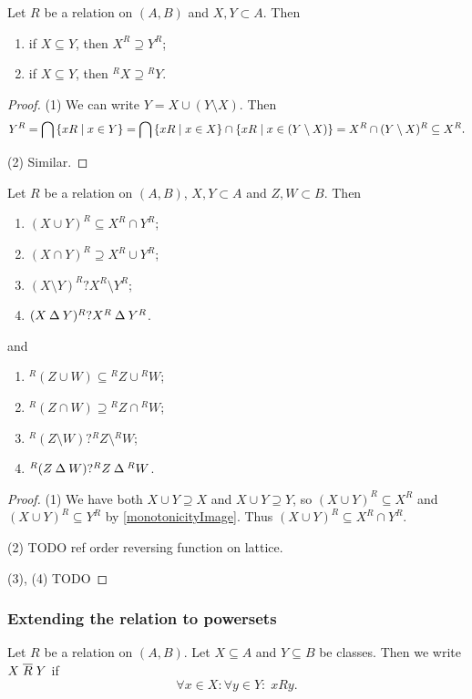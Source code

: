 \begin{corollary} \label{monotonicityPolars}
Let $R$ be a relation on $(A, B)$ and $X,Y\subset A$. Then
\begin{enumerate}
\item if $X\subseteq Y$, then $X^R \supseteq Y^R$;
\item if $X\subseteq Y$, then ${^RX} \supseteq {^RY}$.
\end{enumerate}
\end{corollary}
\begin{proof}
(1) We can write $Y = X \cup (Y\setminus X)$. Then
\[ Y^R = \bigcap \left\{ xR \;\middle|\; x\in Y \right\} = \bigcap \left\{ xR \;\middle|\; x\in X \right\}\cap\left\{ xR \;\middle|\; x\in (Y\setminus X) \right\} = X^R \cap (Y\setminus X)^R \subseteq X^R. \]

(2) Similar.
\end{proof}
\begin{corollary} \label{polarasRelation}
Let $R$ be a relation on $(A, B)$, $X,Y\subset A$ and $Z,W\subset B$. Then
\begin{enumerate}
\item $(X\cup Y)^R \subseteq X^R\cap Y^R$;
\item $(X\cap Y)^R \supseteq X^R\cup Y^R$;
\item $(X\setminus Y)^R ? X^R\setminus Y^R$;
\item $(X\mathbin{\Delta} Y)^R ? X^R\mathbin{\Delta} Y^R$.
\end{enumerate}
and
\begin{enumerate}
\item $^R(Z\cup W) \subseteq {^RZ}\cup {^RW}$;
\item $^R(Z\cap W) \supseteq {^RZ}\cap {^RW}$;
\item $^R(Z\setminus W) ? {^RZ}\setminus {^RW}$;
\item $^R(Z\mathbin{\Delta} W) ? {^RZ}\mathbin{\Delta} {^RW}$.
\end{enumerate}
\end{corollary}
\begin{proof}\mbox{}
(1) We have both $X\cup Y \supseteq X$ and $X\cup Y \supseteq Y$, so $(X\cup Y)^R \subseteq X^R$ and $(X\cup Y)^R \subseteq Y^R$ by \ref{monotonicityImage}. Thus $(X\cup Y)^R \subseteq X^R\cap Y^R$.

(2) TODO ref order reversing function on lattice.

(3), (4) TODO
\end{proof}

\subsubsection{Extending the relation to powersets}
\begin{definition}
Let $R$ be a relation on $(A,B)$. Let $X\subseteq A$ and $Y\subseteq B$ be classes. Then we write $X\mathrel{\overline{R}}Y$ if
\[ \forall x\in X: \forall y\in Y: \; xRy. \]
\end{definition}

